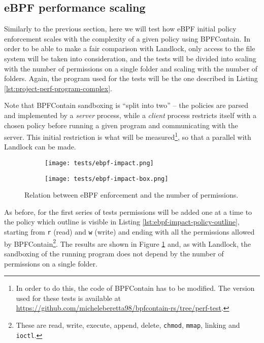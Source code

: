 \subsection{eBPF performance scaling}
\label{sec:performance-internal-analysis-ebpf-impact}

Similarly to the previous section, here we will test how eBPF initial policy enforcement scales with the complexity
of a given policy using BPFContain. In order to be able to make a fair comparison with Landlock, only
access to the file system will be taken into consideration, and the tests
will be divided into scaling with the number of permissions on a single folder
and scaling with the number of folders.
Again, the program used for the tests will be the one described in Listing \ref{lst:project-perf-program-complex}.

Note that BPFContain sandboxing is ``split into two'' -- the policies are parsed
and implemented by a \textit{server} process, while a \textit{client} process restricts itself
with a chosen policy before running a given program and communicating with the server.
This initial restriction is what will be
measured\footnote{In order to do this, the code of BPFContain has to be modified. The version
used for these tests is available at \url{https://github.com/micheleberetta98/bpfcontain-rs/tree/perf-test}.},
so that a parallel with Landlock can be made.

\begin{figure}[hbt!]
  \centering
  \begin{subfigure}[b]{0.49\textwidth}
    \texttt{[image: tests/ebpf-impact.png]}
  \end{subfigure}
  \begin{subfigure}[b]{0.49\textwidth}
    \texttt{[image: tests/ebpf-impact-box.png]}
  \end{subfigure}

  \caption{Relation between eBPF enforcement and the number of permissions.}
  \label{fig:perf-test-ebpf-impact-permissions}
\end{figure}

As before, for the first series of tests permissions will be added one at a time to the policy
which outline is visible in Listing \ref{lst:ebpf-impact-policy-outline}, starting from \texttt{r} (read) and \texttt{w} (write) and ending with
all the permissions allowed by BPFContain\footnote{These are read, write, execute, append, delete, \texttt{chmod},
\texttt{mmap}, linking and \texttt{ioctl}.}.
The results are shown in Figure \ref{fig:perf-test-ebpf-impact-permissions} and, as with Landlock, 
the sandboxing of the running program does not depend by the number of permissions on a single folder.

